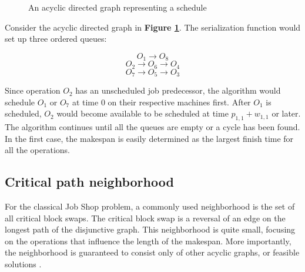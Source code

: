 \documentclass[a4paper,10pt]{article}
\begin{document}
\begin{figure}[h]
\centering
{}
\caption{An acyclic directed graph representing a schedule}
\label{fig:dag}
\end{figure}

Consider the acyclic directed graph in \textbf{Figure \ref{fig:dag}}. The serialization function would set up three ordered queues:

\[ O_1 \rightarrow O_8 \]
\[ O_2 \rightarrow O_6 \rightarrow O_4 \]
\[ O_7 \rightarrow O_5 \rightarrow O_3 \]

Since operation $O_2$ has an unscheduled job predecessor, the algorithm would schedule $O_1$ or $O_7$ at time 0 on their respective machines first. After $O_1$ is scheduled, $O_2$ would become available to be scheduled at time $p_{1,1} + w_{1,1}$ or later. The algorithm continues until all the queues are empty or a cycle has been found. In the first case, the makespan is easily determined as the largest finish time for all the operations.

\subsection{Critical path neighborhood}

For the classical Job Shop problem, a commonly used neighborhood is the set of all critical block swaps. The critical block swap is a reversal of an edge on the longest path of the disjunctive graph. This neighborhood is quite small, focusing on the operations that influence the length of the makespan. More importantly, the neighborhood is guaranteed to consist only of other acyclic graphs, or feasible solutions \cite{simulatedannealingjsp}.
\end{document}
